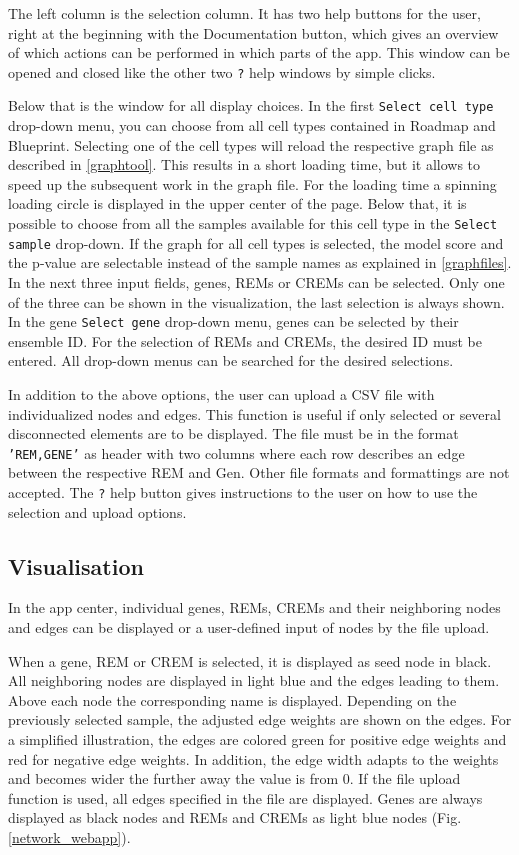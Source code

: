 \documentclass[pdftex,12pt,a4paper]{report}
\begin{document}
The left column is the selection column. It has two help buttons for the user, right at the beginning with the Documentation button, which gives an overview of which actions can be performed in which parts of the app. This window can be opened and closed like the other two \texttt{?} help windows by simple clicks. 

Below that is the window for all display choices. In the first \texttt{Select cell type} drop-down menu, you can choose from all cell types contained in Roadmap\cite{roadmap} and Blueprint\cite{blueprint}. Selecting one of the cell types will reload the respective graph file as described in \ref{graphtool}. This results in a short loading time, but it allows to speed up the subsequent work in the graph file. For the loading time a spinning loading circle is displayed in the upper center of the page. Below that, it is possible to choose from all the samples available for this cell type in the \texttt{Select sample} drop-down. If the graph for all cell types is selected, the model score and the p-value are selectable instead of the sample names as explained in \ref{graphfiles}. In the next three input fields, genes, REMs or CREMs can be selected. Only one of the three can be shown in the visualization, the last selection is always shown. In the gene \texttt{Select gene} drop-down menu, genes can be selected by their ensemble ID. For the selection of REMs and CREMs, the desired ID must be entered. All drop-down menus can be searched for the desired selections. 

In addition to the above options, the user can upload a CSV file with individualized nodes and edges. This function is useful if only selected or several disconnected elements are to be displayed. The file must be in the format \texttt{'REM,GENE'} as header with two columns where each row describes an edge between the respective REM and Gen. Other file formats and formattings are not accepted. The \texttt{?} help button gives instructions to the user on how to use the selection and upload options.

\subsection{Visualisation}
In the app center, individual genes, REMs, CREMs and their neighboring nodes and edges can be displayed or a user-defined input of nodes by the file upload.

When a gene, REM or CREM is selected, it is displayed as seed node in black. All neighboring nodes are displayed in light blue and the edges leading to them. Above each node the corresponding name is displayed. Depending on the previously selected sample, the adjusted edge weights are shown on the edges. For a simplified illustration, the edges are colored green for positive edge weights and red for negative edge weights. In addition, the edge width adapts to the weights and becomes wider the further away the value is from 0. If the file upload function is used, all edges specified in the file are displayed. Genes are always displayed as black nodes and REMs and CREMs as light blue nodes (Fig. \ref{network_webapp}). 
\end{document}
